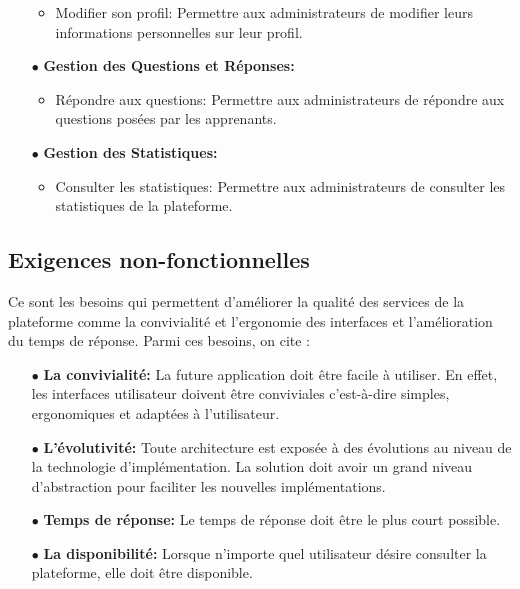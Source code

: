 \begin{itemize}
    \begin{itemize}
        \item  Modifier son profil: Permettre aux administrateurs de modifier leurs informations personnelles sur leur profil.
    \end{itemize}
    \item[$\bullet$] \textbf{Gestion des Questions et Réponses:}
    \begin{itemize}
        \item  Répondre aux questions: Permettre aux administrateurs de répondre aux questions posées par les apprenants.
    \end{itemize}
    \item[$\bullet$] \textbf{Gestion des Statistiques:}
    \begin{itemize}
        \item  Consulter les statistiques: Permettre aux administrateurs de consulter les statistiques de la plateforme.
    \end{itemize}
\end{itemize}


\subsection{Exigences non-fonctionnelles}


Ce sont les besoins qui permettent d’améliorer la qualité des services de la plateforme comme la convivialité et l’ergonomie des interfaces et l’amélioration du temps de réponse. Parmi ces besoins, on cite :

\begin{itemize}
    \item[$\bullet$] \textbf{La convivialité:} La future application doit être facile à utiliser. En effet, les interfaces utilisateur doivent être conviviales c’est-à-dire simples, ergonomiques et adaptées à l’utilisateur.
    \item[$\bullet$] \textbf{L’évolutivité:} Toute architecture est exposée à des évolutions au niveau de la technologie d’implémentation. La solution doit avoir un grand niveau d’abstraction pour faciliter les nouvelles implémentations.
    \item[$\bullet$] \textbf{Temps de réponse:} Le temps de réponse doit être le plus court possible.
    \item[$\bullet$] \textbf{La disponibilité:} Lorsque n’importe quel utilisateur désire consulter la plateforme, elle doit être disponible.
\end{itemize}

